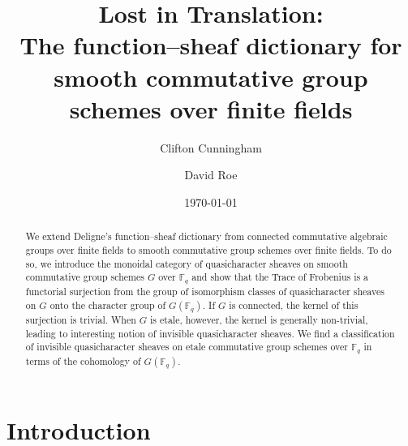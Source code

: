 \documentclass{amsart}
\title[Lost in Translation: The function--sheaf dictionary]{Lost in Translation: \\ The function--sheaf dictionary for smooth commutative group schemes over finite fields}
\date{\today}
\author{Clifton Cunningham}
\author{David Roe}
\theoremstyle{plain}
\theoremstyle{definition}
\theoremstyle{remark}
\begin{document}
\begin{abstract}
  We extend Deligne's function--sheaf dictionary from
  connected commutative algebraic groups over finite fields to smooth
  commutative group schemes over finite fields.
  To do so, we introduce the monoidal category of quasicharacter sheaves on
  smooth commutative group schemes $G$ over $\mathbb{F}_q$
  and show that the Trace of Frobenius is a functorial surjection
  from the group of isomorphism classes of quasicharacter sheaves on $G$
  onto the character group of $G(\mathbb{F}_q)$.
  If $G$ is connected, the kernel of this surjection is trivial.
  When $G$ is etale, however, the kernel is generally non-trivial,
  leading to interesting notion of invisible quasicharacter sheaves.
  We find a classification of invisible quasicharacter sheaves
  on etale commutative group schemes over $\mathbb{F}_q$
  in terms of the cohomology of $G(\mathbb{F}_q)$.
   \end{abstract}

\maketitle

\section*{Introduction}
\end{document}

